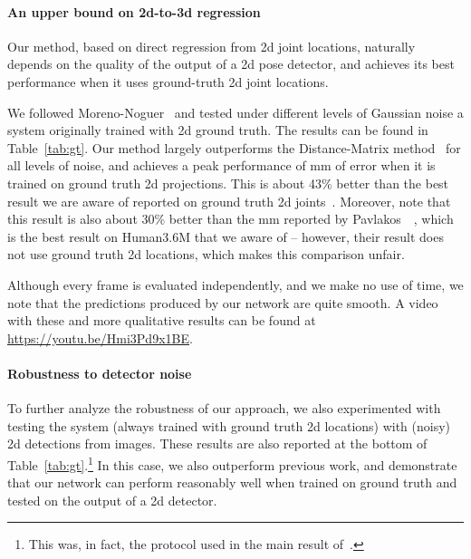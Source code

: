 \documentclass[10pt,twocolumn,letterpaper]{article}
\begin{document}
\paragraph{An upper bound on 2d-to-3d regression}
Our method, based on direct regression from 2d joint locations, naturally depends on the quality of the output of a 2d pose detector, and achieves its best performance when it uses ground-truth 2d joint locations.

We followed Moreno-Noguer~\cite{distance-matrix} and tested under different levels of Gaussian noise a system originally trained with 2d ground truth. The results can be found in Table~\ref{tab:gt}. Our method largely outperforms the Distance-Matrix method~\cite{distance-matrix} for all levels of noise, and achieves a peak performance of  mm of error when it is trained on ground truth 2d projections. This is about 43\% better than the best result we are aware of reported on ground truth 2d joints~\cite{distance-matrix}.
Moreover, note that this result is also about 30\% better than the  mm reported by Pavlakos~\etal~\cite{volumetric}, which is the best result on Human3.6M that we aware of -- however, their result does not use ground truth 2d locations, which makes this comparison unfair.

Although every frame is evaluated independently, and we make no use of time, we note that the predictions produced by our network are quite smooth.
A video with these and more qualitative results can be found at \url{https://youtu.be/Hmi3Pd9x1BE}.


\paragraph{Robustness to detector noise}

To further analyze the robustness of our approach, we also experimented with testing the system (always trained with  ground truth 2d locations) with (noisy) 2d detections from images.
These results are also reported at the bottom of Table~\ref{tab:gt}.\footnote{This was, in fact, the protocol used in the main result of~\cite{distance-matrix}.} In this case, we also outperform previous work, and demonstrate that our network can perform reasonably well when trained on ground truth and tested on the output of a 2d detector.
\end{document}
